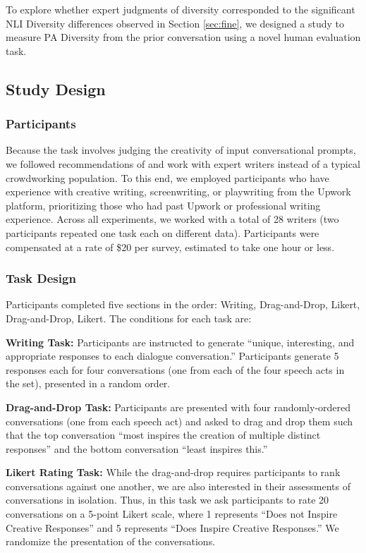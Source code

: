 \documentclass[11pt]{article}
\newcommand{\edivshortspace}{PA Diversity }
\begin{document}
To explore whether expert judgments of diversity corresponded to the significant NLI Diversity differences observed in Section \ref{sec:fine}, we designed a study to measure \edivshortspace 
from the prior conversation using a novel human evaluation task.

\subsection{Study Design}

\subsubsection{Participants}
Because the task involves judging the creativity of input conversational prompts, we followed recommendations of \citet{kaufman} and  work with expert writers instead of a typical crowdworking population.  To this end, we employed  participants  who have experience with creative writing, screenwriting, or playwriting from the Upwork platform, prioritizing those who had past Upwork  or professional writing experience.  Across all experiments, we worked with a total of 28 writers (two participants repeated one task each on different data).  
Participants were compensated at a rate of \$20 per survey, estimated to take one hour or less.

\subsubsection{Task Design}
Participants completed five sections in the order:  Writing, Drag-and-Drop, Likert, Drag-and-Drop, Likert.
The conditions for each task are:

\textbf{Writing Task:} Participants are instructed to generate ``unique, interesting, and appropriate responses to each dialogue conversation.'' 
Participants generate 5 responses each for four conversations (one from each of the four speech acts in the set), presented in a random order.  
 

\textbf{Drag-and-Drop Task:} 
Participants are  presented with four randomly-ordered conversations (one from each speech act) and asked to drag and drop them such that the top conversation ``most inspires the creation of multiple distinct responses''  and the bottom conversation ``least inspires this.''  

\textbf{Likert Rating Task:}
While the drag-and-drop requires participants to rank conversations against one another, we are also interested in their assessments of conversations in isolation.  Thus, in this task we ask participants to rate 20 conversations on 
a 5-point Likert scale, where 1 represents ``Does not Inspire Creative Responses'' and 5 represents ``Does Inspire Creative Responses.''  We randomize the presentation of the conversations.
\end{document}
